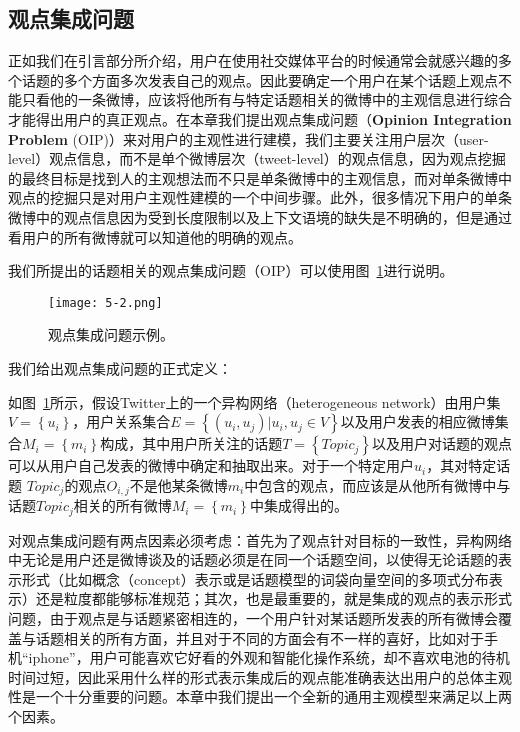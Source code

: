 \begin{landscape}
\section{观点集成问题}
\label{sec3}
正如我们在引言部分所介绍，用户在使用社交媒体平台的时候通常会就感兴趣的多个话题的多个方面多次发表自己的观点。因此要确定一个用户在某个话题上观点不能只看他的一条微博，应该将他所有与特定话题相关的微博中的主观信息进行综合才能得出用户的真正观点。在本章我们提出观点集成问题（\textbf{Opinion Integration Problem} (OIP)）来对用户的主观性进行建模，我们主要关注用户层次（user-level）观点信息，而不是单个微博层次（tweet-level）的观点信息，因为观点挖掘的最终目标是找到人的主观想法而不只是单条微博中的主观信息，而对单条微博中观点的挖掘只是对用户主观性建模的一个中间步骤。此外，很多情况下用户的单条微博中的观点信息因为受到长度限制以及上下文语境的缺失是不明确的，但是通过看用户的所有微博就可以知道他的明确的观点。

我们所提出的话题相关的观点集成问题（OIP）可以使用图~\ref{fig5-2}进行说明。
\begin{figure}[htb]
\centering
\texttt{[image: 5-2.png]}
\caption{观点集成问题示例。}
\label{fig5-2}
\end{figure}

我们给出观点集成问题的正式定义：

\begin{definition}[观点集成问题]
如图~\ref{fig5-2}所示，假设Twitter上的一个异构网络（heterogeneous network）由用户集$ V=\left\{ u_{i} \right\} $，用户关系集合$ E=\left\{(u_{i},u_{j})| u_{i},u_{j} \in V\right\} $以及用户发表的相应微博集合$ M_{i}=\left\{ m_{i} \right\} $构成，其中用户所关注的话题$ T=\left\{ Topic_{j} \right\} $以及用户对话题的观点可以从用户自己发表的微博中确定和抽取出来。对于一个特定用户$ u_{i} $，其对特定话题 $ Topic_{j} $的观点$ O_{i,j} $不是他某条微博$ m_{i} $中包含的观点，而应该是从他所有微博中与话题$ Topic_{j} $相关的所有微博$ M_{i}=\left\{ m_{i} \right\} $中集成得出的。
\end{definition}

对观点集成问题有两点因素必须考虑：首先为了观点针对目标的一致性，异构网络中无论是用户还是微博谈及的话题必须是在同一个话题空间，以使得无论话题的表示形式（比如概念（concept）表示或是话题模型的词袋向量空间的多项式分布表示）还是粒度都能够标准规范；其次，也是最重要的，就是集成的观点的表示形式问题，由于观点是与话题紧密相连的，一个用户针对某话题所发表的所有微博会覆盖与话题相关的所有方面，并且对于不同的方面会有不一样的喜好，比如对于手机“iphone”，用户可能喜欢它好看的外观和智能化操作系统，却不喜欢电池的待机时间过短，因此采用什么样的形式表示集成后的观点能准确表达出用户的总体主观性是一个十分重要的问题。本章中我们提出一个全新的通用主观模型来满足以上两个因素。


\end{landscape}
